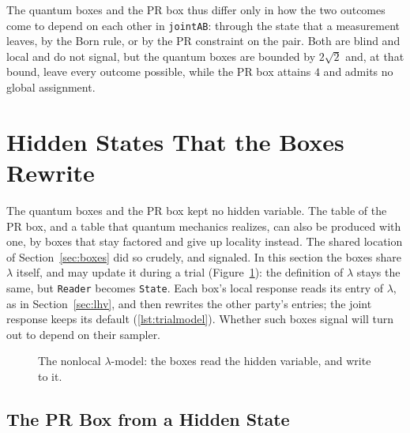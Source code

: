 \documentclass[11pt]{article}
\newcommand{\hs}{\lstinline[style=hask,basicstyle=\ttfamily,frame=none]}
\newcommand{\twoboxes}{%
  \node[fbox] (f) at (0,0) {$f$};
  \node[gbox] (g) at (5.4,0) {$g$};
  \node (a) at (0,1.3) {$a \in \{0,1\}$};
  \node (b) at (5.4,1.3) {$b \in \{0,1\}$};
  \node (x) at (0,-1.3) {$x \in \{\pm1\}$};
  \node (y) at (5.4,-1.3) {$y \in \{\pm1\}$};
  \draw[->] (a) -- (f); \draw[->] (b) -- (g);
  \draw[->] (f) -- (x); \draw[->] (g) -- (y);
  \node[font=\bfseries, anchor=east] at (-1.25,0) {Alice};
  \node[font=\bfseries, anchor=west] at (6.65,0) {Bob};}
\begin{document}
The quantum boxes and the PR box thus differ only in how the two outcomes come to depend on each other in \hs|jointAB|: through the state that a measurement leaves, by the Born rule, or by the PR constraint on the pair. Both are blind and local and do not signal, but the quantum boxes are bounded by $2\sqrt2$ and, at that bound, leave every outcome possible, while the PR box attains $4$ and admits no global assignment.

\section{Hidden States That the Boxes Rewrite}\label{sec:hidden}

The quantum boxes and the PR box kept no hidden variable. The table of the PR box, and a table that quantum mechanics realizes, can also be produced with one, by boxes that stay factored and give up locality instead. The shared location of Section~\ref{sec:boxes} did so crudely, and signaled. In this section the boxes share $\lambda$ itself, and may update it during a trial (Figure~\ref{fig:nonlocal}): the definition of $\lambda$ stays the same, but \hs|Reader| becomes \hs|State|. Each box's local response reads its entry of $\lambda$, as in Section~\ref{sec:lhv}, and then rewrites the other party's entries; the joint response keeps its default (\ref{lst:trialmodel}). Whether such boxes signal will turn out to depend on their sampler.

\begin{figure}[htbp]
\centering
{}
\caption{The nonlocal $\lambda$-model: the boxes read the hidden variable, and write to it.}
\label{fig:nonlocal}
\end{figure}

\subsection{The PR Box from a Hidden State}\label{sec:prstate}
\end{document}
